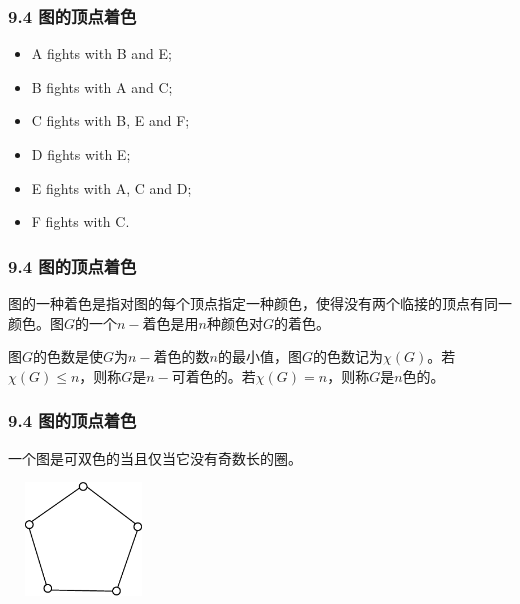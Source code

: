 \documentclass{beamer}
\begin{document}
\begin{CJK}{UTF8}{gbsn}
\begin{frame}
  \frametitle{9.4 图的顶点着色}
  \begin{itemize}
  \item A fights with B and E;
  \item B fights with A and C;
  \item C fights with B, E and F;
  \item D fights with E;
  \item E fights with A, C and D;
    \item F fights with C.
  \end{itemize}
\end{frame}
\begin{frame}
  \frametitle{9.4 图的顶点着色}
  \begin{definition9.4.1}
    图的一种着色是指对图的每个顶点指定一种颜色，使得没有两个临接的顶点有同一颜色。图$G$的一个$n-$着色是用$n$种颜色对$G$的着色。
  \end{definition9.4.1}
  \begin{definition9.4.2}
    图$G$的色数是使$G$为$n-$着色的数$n$的最小值，图$G$的色数记为$\chi(G)$。若$\chi (G) \leq n$，则称$G$是$n-$可着色的。若$\chi (G) = n$，则称$G$是$n$色的。
  \end{definition9.4.2}
\end{frame}
\begin{frame}
  \frametitle{9.4 图的顶点着色}
  \begin{theorem9.4.1}
    一个图是可双色的当且仅当它没有奇数长的圈。
  \end{theorem9.4.1}
\vspace{1cm}
  \begin{minipage}{0.45\linewidth}
\includegraphics[width=4cm,height=3cm]{pentagon}    
  \end{minipage}
  \begin{minipage}{0.45\linewidth}
   
  \end{minipage}
\end{frame}


\end{CJK}
\end{document}
